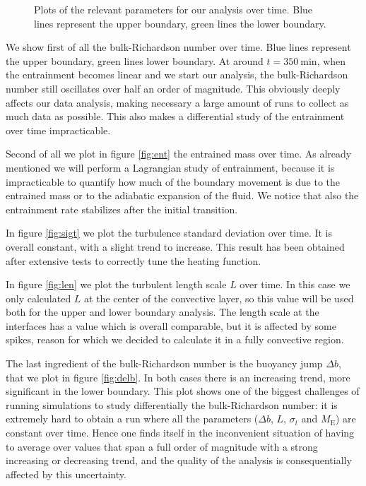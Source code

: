 \begin{figure}[t!]
      \hfill
	\caption{Plots of the relevant parameters for our analysis over time. Blue lines represent the upper boundary, green lines the lower boundary.}
	  \label{fig:2dsingle}
  \end{figure}
We show first of all the bulk-Richardson number over time. Blue lines represent the upper boundary, green lines lower boundary. At around $t=\mathrm{350 \ min}$, when the entrainment becomes linear and we start our analysis, the bulk-Richardson number still oscillates over half an order of magnitude. This obviously deeply affects our data analysis, making necessary a large amount of runs to collect as much data as possible. This also makes a differential study of the entrainment over time impracticable. 

Second of all we plot in figure \ref{fig:ent} the entrained mass over time. As already mentioned we will perform a Lagrangian study of entrainment, because it is impracticable to quantify how much of the boundary movement is due to the entrained mass or to the adiabatic expansion of the fluid. We notice that also the entrainment rate stabilizes after the initial transition. 

  In figure \ref{fig:sigt} we plot the turbulence standard deviation over time. It is overall constant, with a slight trend to increase. This result has been obtained after extensive tests to correctly tune the heating function.

  In figure \ref{fig:len} we plot the turbulent length scale $L$ over time. In this case we only calculated $L$ at the center of the convective layer, so this value will be used both for the upper and lower boundary analysis. The length scale at the interfaces has a value which is overall comparable, but it is affected by some spikes, reason for which we decided to calculate it in a fully convective region.

  The last ingredient of the bulk-Richardson number is the buoyancy jump $\Delta b$, that we plot in figure \ref{fig:delb}. In both cases there is an increasing trend, more significant in the lower boundary. This plot shows one of the biggest challenges of running simulations to study differentially the bulk-Richardson number: it is extremely hard to obtain a run where all the parameters ($\Delta b$, $L$, $\sigma_t$ and $M_{\mathrm{E}}$) are constant over time. Hence one finds itself in the inconvenient situation of having to average over values that span a full order of magnitude with a strong increasing or decreasing trend, and the quality of the analysis is consequentially affected by this uncertainty.

